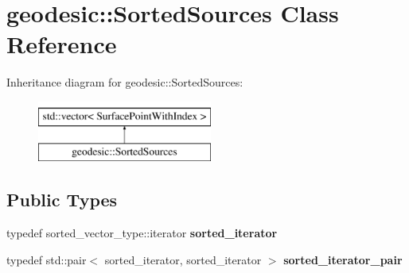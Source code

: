\hypertarget{classgeodesic_1_1_sorted_sources}{}\section{geodesic\+:\+:Sorted\+Sources Class Reference}
\label{classgeodesic_1_1_sorted_sources}
Inheritance diagram for geodesic\+:\+:Sorted\+Sources\+:\begin{figure}[H]
\begin{center}
\leavevmode
\includegraphics[height=2.000000cm]{classgeodesic_1_1_sorted_sources}
\end{center}
\end{figure}
\subsection*{Public Types}
\begin{DoxyCompactItemize}
\item 
\hypertarget{classgeodesic_1_1_sorted_sources_acd957746ac3c18a3cdd967265b30e38c}{}typedef sorted\+\_\+vector\+\_\+type\+::iterator {\bfseries sorted\+\_\+iterator}\label{classgeodesic_1_1_sorted_sources_acd957746ac3c18a3cdd967265b30e38c}

\item 
\hypertarget{classgeodesic_1_1_sorted_sources_a32da5561139fa13acca82f855604cf16}{}typedef std\+::pair$<$ sorted\+\_\+iterator, sorted\+\_\+iterator $>$ {\bfseries sorted\+\_\+iterator\+\_\+pair}\label{classgeodesic_1_1_sorted_sources_a32da5561139fa13acca82f855604cf16}

\end{DoxyCompactItemize}
